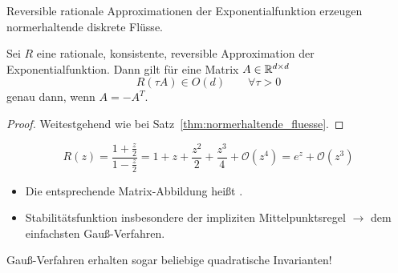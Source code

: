 Reversible rationale Approximationen der Exponentialfunktion erzeugen normerhaltende diskrete Flüsse.

\begin{satz}
	Sei $R$ eine rationale, konsistente, reversible Approximation der Exponentialfunktion. Dann gilt für eine Matrix $A\in\mathbb R^{d\times d}$
	\begin{equation*}
		R(\tau A)\in O(d)\qquad\forall \tau > 0
	\end{equation*}
	genau dann, wenn $A=-A^T$.
\end{satz}
\begin{proof}
	Weitestgehend wie bei Satz~\ref{thm:normerhaltende_fluesse}.
\end{proof}

\begin{bsp}
	\begin{equation*}
		R(z) = \frac{1+\frac{z}{2}}{1-\frac{z}{2}}=1+z+\frac{z^2}{2} + \frac{z^3}{4} + \mathcal{O}(z^4) = e^z + \mathcal O(z^3)
	\end{equation*}
	\begin{itemize}
		\item Die entsprechende Matrix-Abbildung heißt .
		\item Stabilitätsfunktion insbesondere der impliziten Mittelpunktsregel $\to$ dem einfachsten Gauß-Verfahren.
	\end{itemize}
	Gauß-Verfahren erhalten sogar beliebige quadratische Invarianten!
\end{bsp}

